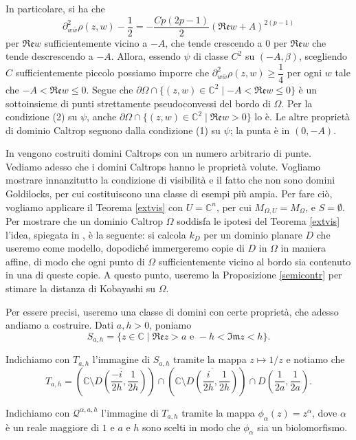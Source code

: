 In particolare, si ha che
$$\partial^2_{w\bar{w}}\rho(z,w)-\frac{1}{2}=-\frac{Cp(2p-1)}{2}(\mathfrak{Re}w+A)^{2(p-1)}$$
per $\mathfrak{Re}w$ sufficientemente vicino a $-A$, che tende crescendo a $0$ per $\mathfrak{Re}w$ che tende descrescendo a $-A$. Allora, essendo $\psi$ di classe $C^2$ su $(-A,\beta)$, scegliendo $C$ sufficientemente piccolo possiamo imporre che $\partial^2_{w\bar{w}}\rho(z,w)\ge\dfrac{1}{4}$ per ogni $w$ tale che $-A<\mathfrak{Re}w\le 0$. Segue che $\partial\Omega\cap\{(z,w)\in\mathbb{C}^2\mid -A<\mathfrak{Re}w\le 0\}$ è un sottoinsieme di punti strettamente pseudoconvessi del bordo di $\Omega$. Per la condizione (2) su $\psi$, anche $\partial\Omega\cap\{(z,w)\in\mathbb{C}^2\mid \mathfrak{Re}w>0\}$ lo è. Le altre proprietà di dominio Caltrop seguono dalla condizione (1) su $\psi$; la punta è in $(0,-A)$.

In \cite[Section 3.2]{BM} vengono costruiti domini Caltrops con un numero arbitrario di punte. \\

Vediamo adesso che i domini Caltrops hanno le proprietà volute. Vogliamo mostrare innanzitutto la condizione di visibilità e il fatto che non sono domini Goldilocks, per cui costituiscono una classe di esempi più ampia. Per fare ciò, vogliamo applicare il Teorema \ref{extvis} con $U=\mathbb{C}^n$, per cui $M_{\Omega,U}=M_\Omega$, e $S=\emptyset$. Per mostrare che un dominio Caltrop $\Omega$ soddisfa le ipotesi del Teorema \ref{extvis} l'idea, spiegata in \cite[Section 6]{BM}, è la seguente: si calcola $k_D$ per un dominio planare $D$ che useremo come modello, dopodiché immergeremo copie di $D$ in $\Omega$ in maniera affine, di modo che ogni punto di $\Omega$ sufficientemente vicino al bordo sia contenuto in una di queste copie. A questo punto, useremo la Proposizione \ref{semicontr} per stimare la distanza di Kobayashi su $\Omega$. 

Per essere precisi, useremo una classe di domini con certe proprietà, che adesso andiamo a costruire. Dati $a,h>0$, poniamo
$$S_{a,h}=\{z\in\mathbb{C}\mid\mathfrak{Re}z>a\text{ e }-h<\mathfrak{Im}z<h\}.$$

Indichiamo con $T_{a,h}$ l'immagine di $S_{a,h}$ tramite la mappa $z\longmapsto 1/z$ e notiamo che
$$T_{a,h}=\left(\mathbb{C}\setminus\overline{D\left(\frac{-i}{2h},\frac{1}{2h}\right)}\right)\cap\left(\mathbb{C}\setminus\overline{D\left(\frac{i}{2h},\frac{1}{2h}\right)}\right)\cap D\left(\frac{1}{2a},\frac{1}{2a}\right).$$

Indichiamo con $\mathcal{Q}^{\alpha,a,h}$ l'immagine di $T_{a,h}$ tramite la mappa $\phi_\alpha(z)=z^{\alpha}$, dove $\alpha$ è un reale maggiore di $1$ e $a$ e $h$ sono scelti in modo che $\phi_\alpha$ sia un biolomorfismo.

